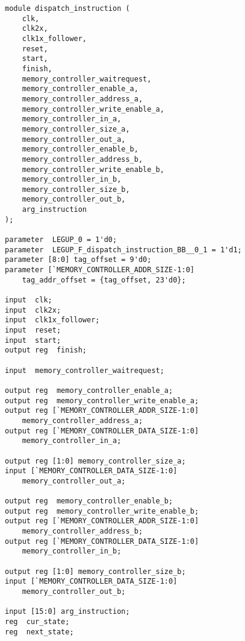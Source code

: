 \documentclass[oneside,a4paper]{article}
\begin{document}
\begin{lstlisting}[style=verilog,caption={Syntheseergebnis für Funktion dispatch\_instruction},label=synthFuncs]
module dispatch_instruction (
    clk,
    clk2x,
    clk1x_follower,
    reset,
    start,
    finish,
    memory_controller_waitrequest,
    memory_controller_enable_a,
    memory_controller_address_a,
    memory_controller_write_enable_a,
    memory_controller_in_a,
    memory_controller_size_a,
    memory_controller_out_a,
    memory_controller_enable_b,
    memory_controller_address_b,
    memory_controller_write_enable_b,
    memory_controller_in_b,
    memory_controller_size_b,
    memory_controller_out_b,
    arg_instruction
);

parameter  LEGUP_0 = 1'd0;
parameter  LEGUP_F_dispatch_instruction_BB__0_1 = 1'd1;
parameter [8:0] tag_offset = 9'd0;
parameter [`MEMORY_CONTROLLER_ADDR_SIZE-1:0]
    tag_addr_offset = {tag_offset, 23'd0};

input  clk;
input  clk2x;
input  clk1x_follower;
input  reset;
input  start;
output reg  finish;

input  memory_controller_waitrequest;

output reg  memory_controller_enable_a;
output reg  memory_controller_write_enable_a;
output reg [`MEMORY_CONTROLLER_ADDR_SIZE-1:0]
    memory_controller_address_a;
output reg [`MEMORY_CONTROLLER_DATA_SIZE-1:0]
    memory_controller_in_a;

output reg [1:0] memory_controller_size_a;
input [`MEMORY_CONTROLLER_DATA_SIZE-1:0]
    memory_controller_out_a;

output reg  memory_controller_enable_b;
output reg  memory_controller_write_enable_b;
output reg [`MEMORY_CONTROLLER_ADDR_SIZE-1:0]
    memory_controller_address_b;
output reg [`MEMORY_CONTROLLER_DATA_SIZE-1:0]
    memory_controller_in_b;

output reg [1:0] memory_controller_size_b;
input [`MEMORY_CONTROLLER_DATA_SIZE-1:0]
    memory_controller_out_b;

input [15:0] arg_instruction;
reg  cur_state;
reg  next_state;
\end{lstlisting}
\end{document}
